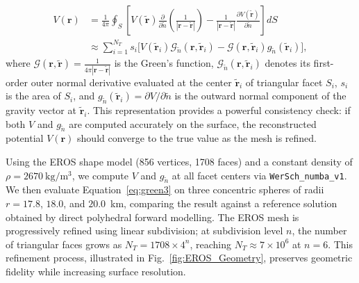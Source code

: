 \documentclass{seg}
\begin{document}
\begin{equation}
\begin{split}
V(\mathbf{r}) &= \frac{1}{4\pi} \oint_S 
\left[ V(\tilde{\mathbf{r}}) \frac{\partial}{\partial \tilde{n}} 
\left( \frac{1}{|\mathbf{r} - \tilde{\mathbf{r}}|} \right)
    - \frac{1}{|\mathbf{r} - \tilde{\mathbf{r}}|} 
    \frac{\partial V(\tilde{\mathbf{r}})}{\partial \tilde{n}} \right] dS \\
&\approx \sum_{i=1}^{N_T} s_i 
\Big[ V(\tilde{\mathbf{r}}_{i}) \mathcal{G}_{\tilde{n}} (\mathbf{r},\tilde{\mathbf{r}}_{i})
    - \mathcal{G}(\mathbf{r},\tilde{\mathbf{r}}_{i}) g_{\tilde{n}}(\tilde{\mathbf{r}}_{i}) \Big],
\end{split}
\tag{8}
\label{eq:green3}
\end{equation}
where $\mathcal{G}(\mathbf{r},\tilde{\mathbf{r}}) = \frac{1}{4\pi |\mathbf{r} - \tilde{\mathbf{r}}|}$ is the Green's function, $\mathcal{G}_{\tilde{n}} (\mathbf{r},\tilde{\mathbf{r}}_{i})$ denotes its first-order outer normal derivative evaluated at the center $\tilde{\mathbf{r}}_i$ of triangular facet $S_i$, $s_i$ is the area of $S_i$, and $g_{\tilde{n}}(\tilde{\mathbf{r}}_{i}) = \partial V / \partial \tilde{n}$ is the outward normal component of the gravity vector at $\tilde{\mathbf{r}}_i$. This representation provides a powerful consistency check: if both $V$ and $g_{\tilde{n}}$ are computed accurately on the surface, the reconstructed potential $V(\mathbf{r})$ should converge to the true value as the mesh is refined.

Using the EROS shape model (856 vertices, 1708 faces) and a constant density of $\rho = 2670~\mathrm{kg/m^3}$, we compute $V$ and $g_{\tilde{n}}$ at all facet centers via \texttt{WerSch\_numba\_v1}. We then evaluate Equation~\eqref{eq:green3} on three concentric spheres of radii $r = 17.8$, $18.0$, and $20.0$~km, comparing the result against a reference solution obtained by direct polyhedral forward modelling. The EROS mesh is progressively refined using linear subdivision; at subdivision level $n$, the number of triangular faces grows as $N_T = 1708 \times 4^n$, reaching $N_T \approx 7 \times 10^6$ at $n = 6$. This refinement process, illustrated in Fig.~\ref{fig:EROS_Geometry}, preserves geometric fidelity while increasing surface resolution.
\end{document}
